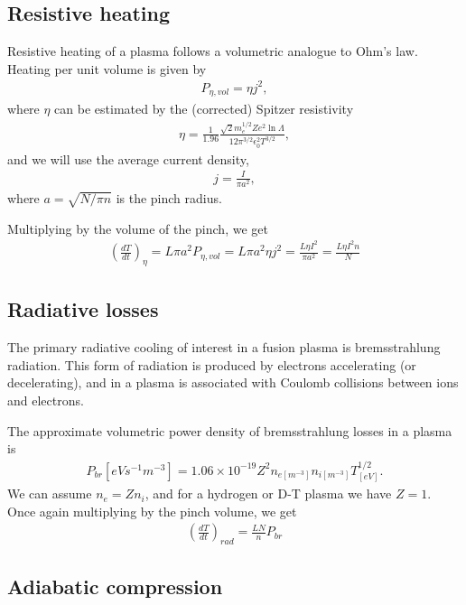 \documentclass{article}
\begin{document}
\subsection{Resistive heating}
Resistive heating of a plasma follows a volumetric analogue to Ohm's law.
Heating per unit volume is given by
\begin{align*}
    P_{\eta,vol} = \eta j^2,
\end{align*}
where $\eta$ can be estimated by the (corrected) Spitzer resistivity \cite{goldstonIntroductionPlasmaPhysics1995a}
\begin{align*}
    \eta = \frac{1}{1.96} \frac{\sqrt{2} m_e^{1/2} Z e^2 \ln \Lambda}{12 \pi^{3/2} \epsilon_0^2 T^{3/2}},
\end{align*}
and we will use the average current density,
\begin{align*}
j = \frac{I}{\pi a^2},
\end{align*}
where $a = \sqrt{N / \pi n}$ is the pinch radius.

Multiplying by the volume of the pinch, we get
\begin{align*}
    \left( \frac{dT}{dt} \right)_\eta = L \pi a^2 P_{\eta,vol} = L \pi a^2 \eta j^2 = \frac{L \eta I^2}{\pi a^2} = \frac{L \eta I^2 n}{N}
\end{align*}

\subsection{Radiative losses}
The primary radiative cooling of interest in a fusion plasma is bremsstrahlung radiation.
This form of radiation is produced by electrons accelerating (or decelerating), and in a
plasma is associated with Coulomb collisions between ions and electrons.

The approximate volumetric power density of bremsstrahlung losses in a plasma is \cite{goldstonIntroductionPlasmaPhysics1995a}
\begin{align*}
    P_{br}[\unit{eV s^{-1} m^{-3}}] = 1.06 \times 10^{-19} Z^2 n_{e[\unit{m^{-3}}]} n_{i[\unit{m^{-3}}]} T_{[\unit{eV}]}^{1/2}.
\end{align*}
We can assume $n_e = Z n_i$, and for a hydrogen or D-T plasma we have $Z = 1$.
Once again multiplying by the pinch volume, we get
\begin{align*}
    \left( \frac{dT}{dt} \right)_{rad} = \frac{L N}{n} P_{br}
\end{align*}

\subsection{Adiabatic compression}
\end{document}
